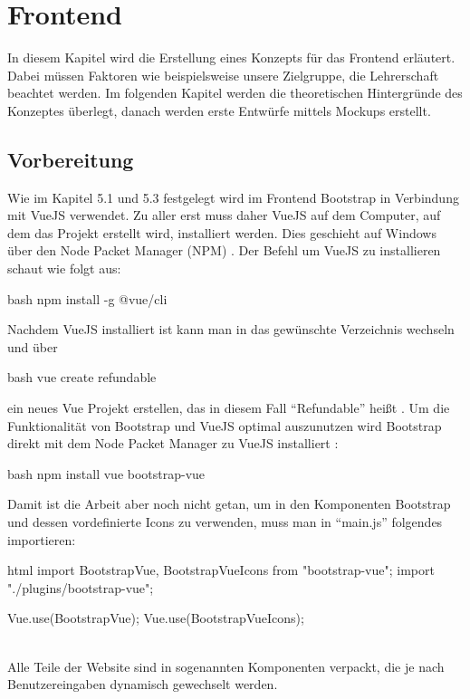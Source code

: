 \section{Frontend}
In diesem Kapitel wird die Erstellung eines Konzepts für das Frontend erläutert. Dabei müssen Faktoren wie beispielsweise unsere Zielgruppe, die Lehrerschaft beachtet werden. Im folgenden Kapitel werden die theoretischen Hintergründe des Konzeptes überlegt, danach werden erste Entwürfe mittels Mockups erstellt. 
\subsection{Vorbereitung}
Wie im Kapitel 5.1 und 5.3 festgelegt wird im Frontend Bootstrap in Verbindung mit VueJS verwendet. Zu aller erst muss daher VueJS auf dem Computer, auf dem das Projekt erstellt wird, installiert werden. Dies geschieht auf Windows über den Node Packet Manager (NPM) \cite{vue-install}. Der Befehl um VueJS zu installieren schaut wie folgt aus:
\begin{code}{bash}
	npm install -g @vue/cli
\end{code}
Nachdem VueJS installiert ist kann man in das gewünschte Verzeichnis wechseln und über
\begin{code}{bash}
	vue create refundable
\end{code}
ein neues Vue Projekt erstellen, das in diesem Fall \enquote{Refundable} heißt \cite{vue-create-project}. Um die Funktionalität von Bootstrap und VueJS optimal auszunutzen wird Bootstrap direkt mit dem Node Packet Manager zu VueJS installiert \cite{bootstrap-vue-getting-started}:
\begin{code}{bash}
	npm install vue bootstrap-vue
\end{code}
Damit ist die Arbeit aber noch nicht getan, um in den Komponenten Bootstrap und dessen vordefinierte Icons zu verwenden, muss man in \enquote{main.js} folgendes importieren:
\begin{code}{html}
	import { BootstrapVue, BootstrapVueIcons } from "bootstrap-vue";
	import "./plugins/bootstrap-vue";
	
	Vue.use(BootstrapVue);
	Vue.use(BootstrapVueIcons);
\end{code}
	\label{list:requcommands} ~\\
Alle Teile der Website sind in sogenannten Komponenten verpackt, die je nach Benutzereingaben dynamisch gewechselt werden. 

